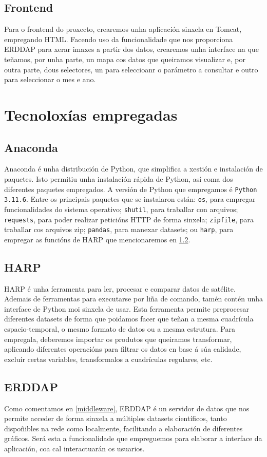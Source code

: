 \subsection{Frontend}\label{frontend}
Para o frontend do proxecto, crearemos unha aplicación sinxela en Tomcat, empregando HTML. Facendo uso da funcionalidade que nos proporciona ERDDAP para xerar imaxes a partir dos datos, crearemos
unha interface na que teñamos, por unha parte, un mapa cos datos que queiramos visualizar e, por outra parte, dous selectores, un para seleccioanr o parámetro a consultar e outro para seleccionar
o mes e ano.

\section{Tecnoloxías empregadas}\label{tecnoloxias}
\subsection{Anaconda}\label{anaconda}
Anaconda é unha distribución de Python, que simplifica a xestión e instalación de paquetes. Isto permitiu unha instalación rápida de Python, así coma dos diferentes paquetes empregados. A versión
de Python que empregamos é \texttt{Python 3.11.6}. Entre os principais paquetes que se instalaron están: \texttt{os}, para empregar funcionalidades do sistema operativo; \texttt{shutil}, para
traballar con arquivos; \texttt{requests}, para poder realizar peticións HTTP de forma sinxela; \texttt{zipfile}, para traballar cos arquivos zip; \texttt{pandas}, para manexar datasets; ou \texttt{harp},
para empregar as funcións de HARP que mencionaremos en \ref{harp}.

\subsection{HARP}\label{harp}
HARP é unha ferramenta para ler, procesar e comparar datos de satélite. Ademais de ferramentas para executarse por liña de comando, tamén contén unha interface de Python moi sinxela de usar. Esta
ferramenta permite preprocesar diferentes datasets de forma que poidamos facer que teñan a mesma cuadrícula espacio-temporal, o mesmo formato de datos ou a mesma estrutura. Para empregala,
deberemos importar os produtos que queiramos transformar, aplicando diferentes operacións para filtrar os datos en base á súa calidade, excluír certas variables, transformalos a cuadrículas
regulares, etc.

\subsection{ERDDAP}
Como comentamos en \ref{middleware}, ERDDAP é un servidor de datos que nos permite acceder de forma sinxela a múltiples datasets científicos, tanto dispoñibles na rede como localmente, facilitando
a elaboración de diferentes gráficos. Será esta a funcionalidade que empreguemos para elaborar a interface da aplicación, coa cal interactuarán os usuarios.


